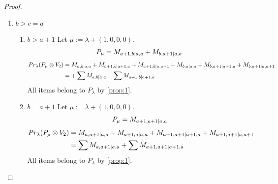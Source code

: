 \documentclass[12pt,a4paper]{article}
\begin{document}
\begin{proof}
\begin{enumerate}
\begin{enumerate}
\item $c=a+1$
        Let $\mu:=\lambda + (0,0,0,1) $. 
\begin{equation}\notag
  \begin{aligned}
      P_{\mu} =
      M_{a,b|a+1,a+1}
+M_{b,a|a+1,a+1}
  \end{aligned}
\end{equation}
\begin{equation}\notag
  \begin{aligned}
  Pr_{\lambda}(P_\mu \otimes V_1) &=
M_{a+1,b|a+1,a+1}
+M_{a,b|a,a+1}
+M_{a,b|a+1,a}
+M_{b,a+1|a+1,a+1}
+M_{b,a|a,a+1}
+M_{b,a|a+1,a} \\
                                  &=
\sum M_{a,b|a+1,a}
+\sum M_{a+1,b|a+1,a+1}
  \end{aligned}
\end{equation}
All items belong to $P_\lambda$ by \cref{prop:1}.
  \end{enumerate}
  
\item $b>c=a$
  \begin{enumerate}
    \item $b>a+1$
        Let $\mu:=\lambda + (1,0,0,0) $. 
\begin{equation}\notag
  \begin{aligned}
      P_{\mu} =M_{a+1,b|a,a}
+M_{b,a+1|a,a}
  \end{aligned}
\end{equation}
\begin{equation}\notag
  \begin{aligned}
  Pr_{\lambda}(P_\mu \otimes V_2) &=
M_{a,b|a,a}
+M_{a+1,b|a+1,a}
+M_{a+1,b|a,a+1}
+M_{b,a|a,a}
+M_{b,a+1|a+1,a}
+M_{b,a+1|a,a+1} \\
                                  &=
+\sum M_{a,b|a,a}
+\sum M_{a+1,b|a+1,a}
  \end{aligned}
\end{equation}
All items belong to $P_\lambda$ by \cref{prop:1}.
    
\item $b=a+1$
        Let $\mu:=\lambda + (1,0,0,0) $. 
\begin{equation}\notag
  \begin{aligned}
      P_{\mu} =M_{a+1,a+1|a,a}
  \end{aligned}
\end{equation}
\begin{equation}\notag
  \begin{aligned}
  Pr_{\lambda}(P_\mu \otimes V_2) &=
M_{a,a+1|a,a}
+M_{a+1,a|a,a}
+M_{a+1,a+1|a+1,a}
+M_{a+1,a+1|a,a+1} \\
                                  &=
\sum M_{a,a+1|a,a}
+\sum M_{a+1,a+1|a+1,a}
  \end{aligned}
\end{equation}
All items belong to $P_\lambda$ by \cref{prop:1}.
  \end{enumerate}
  

\end{enumerate}
\end{proof}
\end{document}
